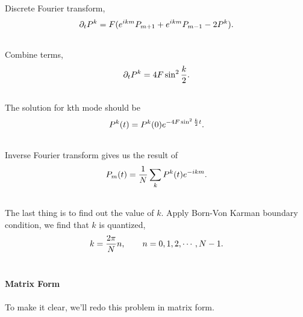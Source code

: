 \documentclass[letterpaper,10pt,english]{sphinxmanual}
\begin{document}
Discrete Fourier transform,
\begin{gather}
\begin{split}\partial_t P^k  = F(e^{ikm} P_{m+1} + e^{ikm} P_{m-1} -2 P^k) .\end{split}\notag\\\begin{split}\end{split}\notag
\end{gather}
Combine terms,
\begin{gather}
\begin{split}\partial_t P^k = 4F\sin^2\frac{k}{2} .\end{split}\notag\\\begin{split}\end{split}\notag
\end{gather}
The solution for kth mode should be
\begin{gather}
\begin{split}P^k(t) = P^k(0) e^{-4F \sin^2\frac{k}{2} t} .\end{split}\notag\\\begin{split}\end{split}\notag
\end{gather}
Inverse Fourier transform gives us the result of
\begin{gather}
\begin{split}P_m(t)  = \frac{1}{N} \sum_ {k} P^k(t) e^{-i km} .\end{split}\notag\\\begin{split}\end{split}\notag
\end{gather}
The last thing is to find out the value of $k$. Apply Born-Von Karman boundary condition, we find that $k$ is quantized,
\begin{gather}
\begin{split}k = \frac{2\pi}{N} n, \qquad n=0,1,2, \cdots, N-1 .\end{split}\notag\\\begin{split}\end{split}\notag
\end{gather}

\paragraph{Matrix Form}
\label{nonequilibrium/week10:matrix-form}
To make it clear, we'll redo this problem in matrix form.
\end{document}
